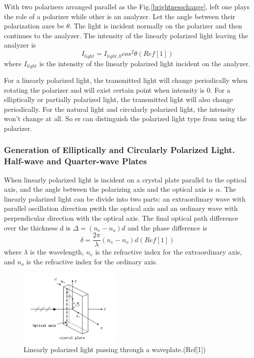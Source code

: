 \documentclass[12pt,a4paper]{article}
\begin{document}
With two polarizers arranged parallel as the Fig.\ref{brightnesschange}, left one plays the role of a polarizer while other is an analyzer. Let the angle between their polarization axes be $\theta$. The light is incident normally on the polarizer and then continues to the analyzer. The intensity of the linearly polarized light leaving the analyzer is
\begin{equation}
    I_{light}=I_{light,0}cos^2\theta (Ref[1])
\end{equation}
where $I_{light}$ is the intensity of the linearly polarized light incident on the analyzer. \par
For a linearly polarized light, the transmitted light will change periodically when rotating the polarizer and will exist certain point when intensity is 0. For a elliptically or partially polarized light, the transmitted light will also change periodically. For the natural light and circularly polarized light, the intensity won't change at all. So er can distinguish the polarized light type from using the polarizer.

\subsubsection{Generation of Elliptically and Circularly Polarized Light. Half-wave and Quarter-wave Plates}
When linearly polarized light is incident on a crystal plate parallel to the optical axis, and the angle between the polarizing axis and the optical axis is $\alpha$. The linearly polarized light can be divide into two parts: an extraordinary wave with parallel oscillation direction pwith the optical axis and an ordinary wave with perpendicular direction with the optical axis. The final optical path difference over the thickness d is $\Delta=(n_e-n_o)d$ and the phase difference is
$$\delta=\frac{2\pi}{\lambda}(n_e-n_o)d (Ref[1])$$
where $\lambda$ is the wavelength, $n_e$ is the refractive index for the extraordinary axis, and $n_o$ is the refractive index for the ordinary axis.
\begin{figure}[H]
    \centering
    \includegraphics[width=5cm]{waveplate.png}
    \caption{Linearly polarized light passing through a waveplate.(Ref[1])}
    \label{waveplate}
\end{figure}
\end{document}
